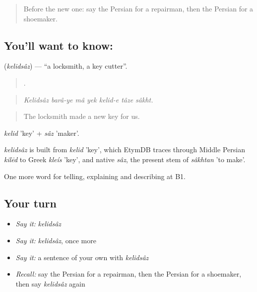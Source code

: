 \label{lesson:FA-C454-kelidsaz}



\begin{quote}
Before the new one: say the Persian for a repairman, then the Persian for a shoemaker.
\end{quote}

\subsection*{You'll want to know:  }
\textbf{ } (\emph{kelidsâz}) — \textquotedblleft{}a locksmith, a key cutter\textquotedblright{}.

\begin{quote}
       .
\end{quote}

\begin{quote}
\emph{Kelidsâz barâ-ye mâ yek kelid-e tâze sâkht.}
\end{quote}

\begin{quote}
The locksmith made a new key for us.
\end{quote}

\emph{kelid} 'key' + \emph{sâz} 'maker'.

\begin{cousinweb}
\emph{kelidsâz} is built from \emph{kelid} 'key', which EtymDB traces through Middle Persian \emph{kilēd} to Greek \emph{kleís} 'key', and native \emph{sâz}, the present stem of \emph{sâkhtan} 'to make'.
\end{cousinweb}

\begin{grammarlens}[title={What you've built}]
One more word for telling, explaining and describing at B1.
\end{grammarlens}

\subsection*{Your turn}
\begin{itemize}
\raggedright
  \item \emph{Say it:} \emph{kelidsâz}
  \item \emph{Say it:} \emph{kelidsâz}, once more
  \item \emph{Say it:} a sentence of your own with \emph{kelidsâz}
  \item \emph{Recall:} say the Persian for a repairman, then the Persian for a shoemaker, then say \emph{kelidsâz} again
\end{itemize}

